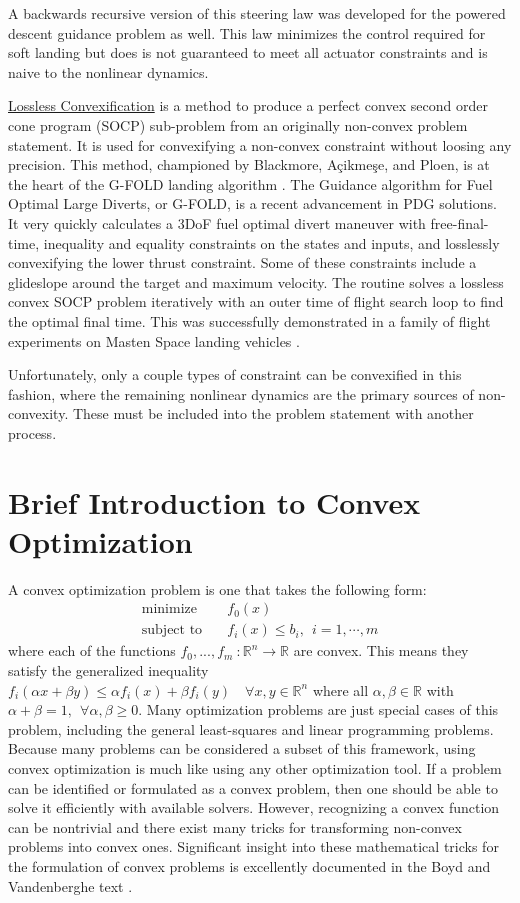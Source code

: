 A backwards recursive version of this steering law was developed for the powered descent guidance problem as well. This law minimizes the control required for soft landing but does is not guaranteed to meet all actuator constraints and is naive to the nonlinear dynamics.

\underline{Lossless Convexification} is a method to produce a perfect convex second order cone program (SOCP) sub-problem from an originally non-convex problem statement. It is used for convexifying a non-convex constraint without loosing any precision. This method, championed by Blackmore, Açikmeşe, and Ploen, is at the heart of the G-FOLD landing algorithm \cite{blackmore2010minimum} \cite{accikmecse2011lossless} \cite{acikmese2012g}. The Guidance algorithm for Fuel Optimal Large Diverts, or G-FOLD, is a recent advancement in PDG solutions. It very quickly calculates a 3DoF fuel optimal divert maneuver with free-final-time, inequality and equality constraints on the states and inputs, and losslessly convexifying the lower thrust constraint. Some of these constraints include a glideslope around the target and maximum velocity. The routine solves a lossless convex SOCP problem iteratively with an outer time of flight search loop to find the optimal final time. This was successfully demonstrated in a family of flight experiments on Masten Space landing vehicles \cite{acikmese2013flight} \cite{scharf2014adapt}.

Unfortunately, only a couple types of constraint can be convexified in this fashion, where the remaining nonlinear dynamics are the primary sources of non-convexity. These must be included into the problem statement with another process.

\section{Brief Introduction to Convex Optimization}
A convex optimization problem is one that takes the following form:
\begin{align*}
	\text{minimize} \quad & f_0(x) \\ 
	\text{subject to} \quad & f_i(x) \leq b_i, \ \ i = 1, \cdots, m
\end{align*}
where each of the functions $f_0,...,f_m \ :\mathbb{R}^n \rightarrow \mathbb{R}$ are convex. This means they satisfy the generalized inequality $f_i(\alpha x + \beta y) \leq \alpha f_i(x) + \beta f_i(y) \quad \forall x, y \in \mathbb{R}^n$ where all $\alpha, \beta \in \mathbb{R}$ with $\alpha + \beta = 1,\ \ \forall \alpha,\beta \geq 0$. Many optimization problems are just special cases of this problem, including the general least-squares and linear programming problems. Because many problems can be considered a subset of this framework, using convex optimization is much like using any other optimization tool. If a problem can be identified or formulated as a convex problem, then one should be able to solve it efficiently with available solvers. However, recognizing a convex function can be nontrivial and there exist many tricks for transforming non-convex problems into convex ones. Significant insight into these mathematical tricks for the formulation of convex problems is excellently documented in the Boyd and Vandenberghe text \cite{boyd2004convex}.

